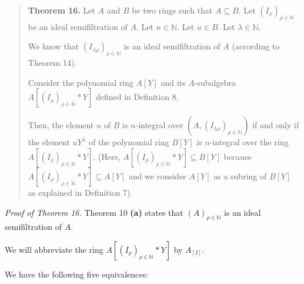 \documentclass[12pt,final,notitlepage,onecolumn]{article}%
\begin{document}
\begin{quote}
\textbf{Theorem 16.} Let $A$ and $B$ be two rings such that $A\subseteq B$.
Let $\left(  I_{\rho}\right)  _{\rho\in\mathbb{N}}$ be an ideal semifiltration
of $A$. Let $n\in\mathbb{N}$. Let $u\in B$. Let $\lambda\in\mathbb{N}$.

We know that $\left(  I_{\lambda\rho}\right)  _{\rho\in\mathbb{N}}$ is an
ideal semifiltration of $A$ (according to Theorem 14).

Consider the polynomial ring $A\left[  Y\right]  $ and its $A$-subalgebra
$A\left[  \left(  I_{\rho}\right)  _{\rho\in\mathbb{N}}\ast Y\right]  $
defined in Definition 8.

Then, the element $u$ of $B$ is $n$-integral over $\left(  A,\left(
I_{\lambda\rho}\right)  _{\rho\in\mathbb{N}}\right)  $ if and only if the
element $uY^{\lambda}$ of the polynomial ring $B\left[  Y\right]  $ is
$n$-integral over the ring $A\left[  \left(  I_{\rho}\right)  _{\rho
\in\mathbb{N}}\ast Y\right]  .$ (Here, $A\left[  \left(  I_{\rho}\right)
_{\rho\in\mathbb{N}}\ast Y\right]  \subseteq B\left[  Y\right]  $ because
$A\left[  \left(  I_{\rho}\right)  _{\rho\in\mathbb{N}}\ast Y\right]
\subseteq A\left[  Y\right]  $ and we consider $A\left[  Y\right]  $ as a
subring of $B\left[  Y\right]  $ as explained in Definition 7).
\end{quote}

\textit{Proof of Theorem 16.} Theorem 10 \textbf{(a)} states that $\left(
A\right)  _{\rho\in\mathbb{N}}$ is an ideal semifiltration of $A$.

We will abbreviate the ring $A\left[  \left(  I_{\rho}\right)  _{\rho
\in\mathbb{N}}\ast Y\right]  $ by $A_{\left[  I\right]  }$.

We have the following five equivalences:
\end{document}
